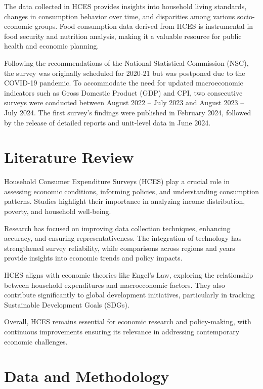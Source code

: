 \documentclass{article}
\begin{document}
	The data collected in HCES provides insights into household living standards, changes in consumption behavior over time, and disparities among various socio-economic groups. Food consumption data derived from HCES is instrumental in food security and nutrition analysis, making it a valuable resource for public health and economic planning.
	
	Following the recommendations of the National Statistical Commission (NSC), the survey was originally scheduled for 2020-21 but was postponed due to the COVID-19 pandemic. To accommodate the need for updated macroeconomic indicators such as Gross Domestic Product (GDP) and CPI, two consecutive surveys were conducted between August 2022 – July 2023 and August 2023 – July 2024. The first survey's findings were published in February 2024, followed by the release of detailed reports and unit-level data in June 2024.
	
	
	
	\section{Literature Review}
	Household Consumer Expenditure Surveys (HCES) play a crucial role in assessing economic conditions, informing policies, and understanding consumption patterns. Studies highlight their importance in analyzing income distribution, poverty, and household well-being.
	
	Research has focused on improving data collection techniques, enhancing accuracy, and ensuring representativeness. The integration of technology has strengthened survey reliability, while comparisons across regions and years provide insights into economic trends and policy impacts.
	
	HCES aligns with economic theories like Engel's Law, exploring the relationship between household expenditures and macroeconomic factors. They also contribute significantly to global development initiatives, particularly in tracking Sustainable Development Goals (SDGs).
	
	Overall, HCES remains essential for economic research and policy-making, with continuous improvements ensuring its relevance in addressing contemporary economic challenges.
	
	
	
	\section{Data and Methodology}
\end{document}
